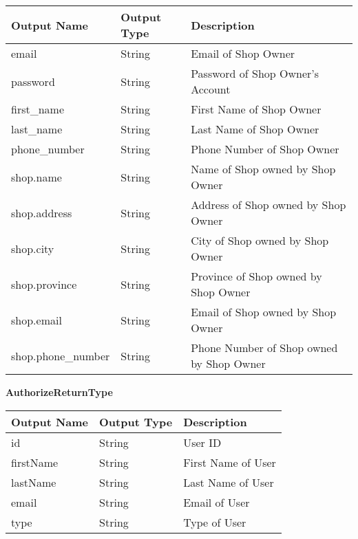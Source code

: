 \documentclass[12pt, titlepage]{article}
\begin{document}
\begin{table}[H]
	\begin{tabular}{|p{}|p{}|p{}|}
		\hline
		\textbf{Output Name} & \textbf{Output Type} & \textbf{Description}                     \\
		\hline
		email                & String               & Email of Shop Owner                      \\
		\hline
		password             & String               & Password of Shop Owner's Account         \\
		\hline
		first\_name          & String               & First Name of Shop Owner                 \\
		\hline
		last\_name           & String               & Last Name of Shop Owner                  \\
		\hline
		phone\_number        & String               & Phone Number of Shop Owner               \\
		\hline
		shop.name            & String               & Name of Shop owned by Shop Owner         \\
		\hline
		shop.address         & String               & Address of Shop owned by Shop Owner      \\
		\hline
		shop.city            & String               & City of Shop owned by Shop Owner         \\
		\hline
		shop.province        & String               & Province of Shop owned by Shop Owner     \\
		\hline
		shop.email           & String               & Email of Shop owned by Shop Owner        \\
		\hline
		shop.phone\_number   & String               & Phone Number of Shop owned by Shop Owner \\
		\hline
	\end{tabular}
\end{table}

\textbf{AuthorizeReturnType}

\begin{table}[H]
	\begin{tabular}{|p{}|p{}|p{}|}
		\hline
		\textbf{Output Name} & \textbf{Output Type} & \textbf{Description} \\
		\hline
		id                   & String               & User ID              \\
		\hline
		firstName            & String               & First Name of User   \\
		\hline
		lastName             & String               & Last Name of User    \\
		\hline
		email                & String               & Email of User        \\
		\hline
		type                 & String               & Type of User         \\
		\hline
	\end{tabular}
\end{table}
\end{document}
